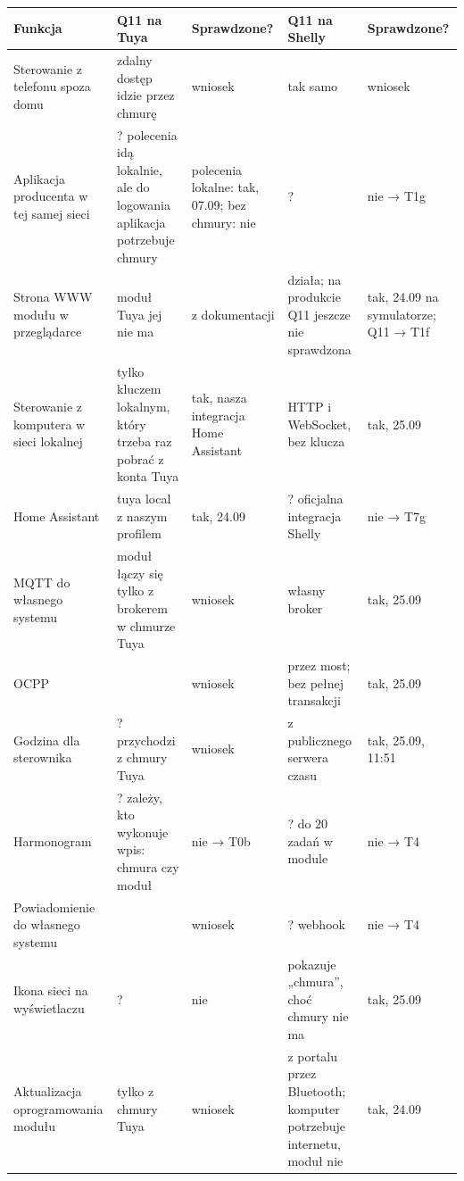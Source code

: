 \documentclass[11pt,a4paper]{article}
\begin{document}
\begin{longtable}{>{\raggedright\arraybackslash}p{3.00cm}>{\raggedright\arraybackslash}p{3.47cm}>{\raggedright\arraybackslash}p{2.34cm}>{\raggedright\arraybackslash}p{3.25cm}>{\raggedright\arraybackslash}p{2.34cm}}
\toprule
\rowcolor{apteallight}\textbf{Funkcja} & \textbf{Q11 na Tuya} & \textbf{Sprawdzone?} & \textbf{Q11 na Shelly} & \textbf{Sprawdzone?} \\
\midrule\endhead
\bottomrule\endfoot
Sterowanie z telefonu spoza domu & \leavevmode{\symbolfont\color{apred}\textbf{✘}} zdalny dostęp idzie przez chmurę & wniosek & \leavevmode{\symbolfont\color{apred}\textbf{✘}} tak samo & wniosek \\
Aplikacja producenta w tej samej sieci & ? polecenia idą lokalnie, ale do logowania aplikacja potrzebuje chmury & polecenia lokalne: tak, 07.09; bez chmury: nie & ? & nie {\symbolfont→} T1g \\
Strona WWW modułu w przeglądarce & \leavevmode{\symbolfont\color{apred}\textbf{✘}} moduł Tuya jej nie ma & z dokumentacji & \leavevmode{\symbolfont\color{apamber}\textbf{◐}} działa; na produkcie Q11 jeszcze nie sprawdzona & tak, 24.09 na symulatorze; Q11 {\symbolfont→} T1f \\
Sterowanie z komputera w sieci lokalnej & \leavevmode{\symbolfont\color{apamber}\textbf{◐}} tylko kluczem lokalnym, który trzeba raz pobrać z konta Tuya & tak, nasza integracja Home Assistant & \leavevmode{\symbolfont\color{apgreen}\textbf{✔}} HTTP i WebSocket, bez klucza & tak, 25.09 \\
Home Assistant & \leavevmode{\symbolfont\color{apamber}\textbf{◐}} tuya local z naszym profilem & tak, 24.09 & ? oficjalna integracja Shelly & nie {\symbolfont→} T7g \\
MQTT do własnego systemu & \leavevmode{\symbolfont\color{apred}\textbf{✘}} moduł łączy się tylko z brokerem w chmurze Tuya & wniosek & \leavevmode{\symbolfont\color{apgreen}\textbf{✔}} własny broker & tak, 25.09 \\
OCPP & \leavevmode{\symbolfont\color{apred}\textbf{✘}} & wniosek & \leavevmode{\symbolfont\color{apamber}\textbf{◐}} przez most; bez pełnej transakcji & tak, 25.09 \\
Godzina dla sterownika & ? przychodzi z chmury Tuya & wniosek & \leavevmode{\symbolfont\color{apgreen}\textbf{✔}} z publicznego serwera czasu & tak, 25.09, 11:51 \\
Harmonogram & ? zależy, kto wykonuje wpis: chmura czy moduł & nie {\symbolfont→} T0b & ? do 20 zadań w module & nie {\symbolfont→} T4 \\
Powiadomienie do własnego systemu & \leavevmode{\symbolfont\color{apred}\textbf{✘}} & wniosek & ? webhook & nie {\symbolfont→} T4 \\
Ikona sieci na wyświetlaczu & ? & nie & \leavevmode{\symbolfont\color{apamber}\textbf{◐}} pokazuje „chmura”, choć chmury nie ma & tak, 25.09 \\
Aktualizacja oprogramowania modułu & \leavevmode{\symbolfont\color{apred}\textbf{✘}} tylko z chmury Tuya & wniosek & \leavevmode{\symbolfont\color{apamber}\textbf{◐}} z portalu przez Bluetooth; komputer potrzebuje internetu, moduł nie & tak, 24.09 \\
\end{longtable}
\end{document}
